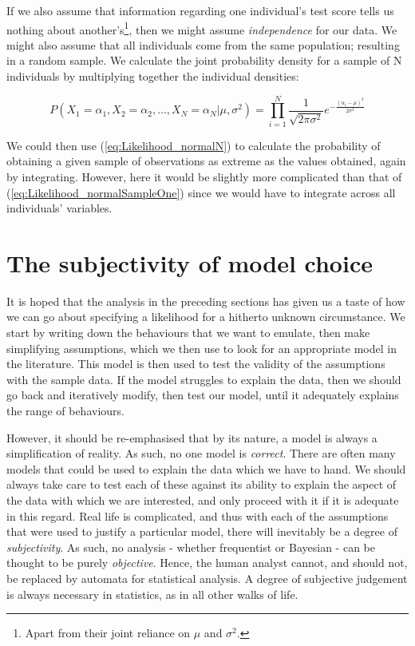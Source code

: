 \documentclass[11pt,fullpage]{book}
\begin{document}
If we also assume that information regarding one individual's test score tells us nothing about another's\footnote{Apart from their joint reliance on $\mu$ and $\sigma^2$.}, then we might assume \textit{independence} for our data. We might also assume that all individuals come from the same population; resulting in a random sample. We calculate the joint probability density for a sample of N individuals by multiplying together the individual densities:


\begin{equation}
P(X_1=\alpha_1,X_2 =\alpha_2,...,X_N=\alpha_N|\mu,\sigma^2) = \prod\limits_{i=1}^{N}\frac{1}{\sqrt{2\pi\sigma^2}}e^{-\frac{(\alpha_i-\mu)^2}{2\sigma^2}}
\end{equation}\label{eq:Likelihood_normalN}


We could then use (\ref{eq:Likelihood_normalN}) to calculate the probability of obtaining a given sample of observations as extreme as the values obtained, again by integrating. However, here it would be slightly more complicated than that of (\ref{eq:Likelihood_normalSampleOne}) since we would have to integrate across all individuals' variables.

\section{The subjectivity of model choice}
It is hoped that the analysis in the preceding sections has given us a taste of how we can go about specifying a likelihood for a hitherto unknown circumstance. We start by writing down the behaviours that we want to emulate, then make simplifying assumptions, which we then use to look for an appropriate model in the literature. This model is then used to test the validity of the assumptions with the sample data. If the model struggles to explain the data, then we should go back and iteratively modify, then test our model, until it adequately explains the range of behaviours.

However, it should be re-emphasised that by its nature, a model is always a simplification of reality. As such, no one model is \textit{correct}. There are often many models that could be used to explain the data which we have to hand. We should always take care to test each of these against its ability to explain the aspect of the data with which we are interested, and only proceed with it if it is adequate in this regard. Real life is complicated, and thus with each of the assumptions that were used to justify a particular model, there will inevitably be a degree of \textit{subjectivity}. As such, no analysis - whether frequentist or Bayesian - can be thought to be purely \textit{objective}. Hence, the human analyst cannot, and should not, be replaced by automata for statistical analysis. A degree of subjective judgement is always necessary in statistics, as in all other walks of life.
\end{document}
